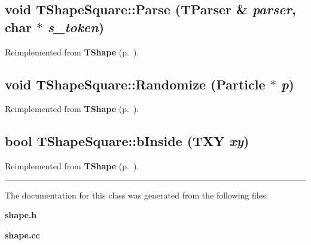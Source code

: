 \label{TShapeSquare_a1}
\subsection{\setlength{\rightskip}{0pt plus 5cm}void TShape\-Square::Parse ({\bf TParser} \& {\em parser}, char $\ast$ {\em s\_\-token})\hspace{0.3cm}{\tt  [virtual]}}



Reimplemented from {\bf TShape} {\rm (p.~\pageref{TShape_a0})}.\label{TShapeSquare_a2}
\subsection{\setlength{\rightskip}{0pt plus 5cm}void TShape\-Square::Randomize ({\bf Particle} $\ast$ {\em p})\hspace{0.3cm}{\tt  [virtual]}}



Reimplemented from {\bf TShape} {\rm (p.~\pageref{TShape_a1})}.\label{TShapeSquare_a3}
\subsection{\setlength{\rightskip}{0pt plus 5cm}bool TShape\-Square::b\-Inside ({\bf TXY} {\em xy})\hspace{0.3cm}{\tt  [virtual]}}



Reimplemented from {\bf TShape} {\rm (p.~\pageref{TShape_a2})}.\vspace{0.4cm}\hrule\vspace{0.2cm}
The documentation for this class was generated from the following files:\begin{CompactItemize}
\item 
{\bf shape.h}\item 
{\bf shape.cc}\end{CompactItemize}
